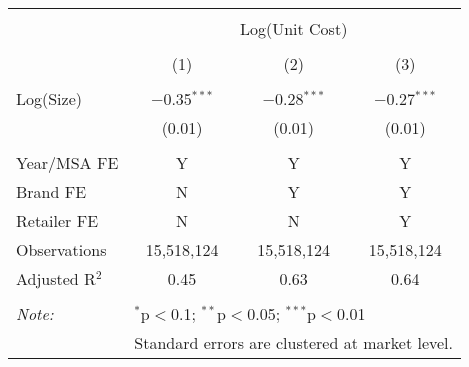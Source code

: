 
\begin{table}[!htbp] \centering 
  \caption{} 
  \label{tab:bulkDiscountUnitCost3625} 
\begin{tabular}{@{\extracolsep{5pt}}lccc} 
\\[-1.8ex]\hline 
\hline \\[-1.8ex] 
 & \multicolumn{3}{c}{Log(Unit Cost)} \\ 
\cline{2-4} 
\\[-1.8ex] & (1) & (2) & (3)\\ 
\hline \\[-1.8ex] 
 Log(Size) & $-$0.35$^{***}$ & $-$0.28$^{***}$ & $-$0.27$^{***}$ \\ 
  & (0.01) & (0.01) & (0.01) \\ 
 \hline \\[-1.8ex] 
Year/MSA FE & Y & Y & Y \\ 
Brand FE & N & Y & Y \\ 
Retailer FE & N & N & Y \\ 
Observations & 15,518,124 & 15,518,124 & 15,518,124 \\ 
Adjusted R$^{2}$ & 0.45 & 0.63 & 0.64 \\ 
\hline 
\hline \\[-1.8ex] 
\textit{Note:}  & \multicolumn{3}{l}{$^{*}$p$<$0.1; $^{**}$p$<$0.05; $^{***}$p$<$0.01} \\ 
 & \multicolumn{3}{l}{Standard errors are clustered at market level.} \\ 
\end{tabular} 
\end{table} 

